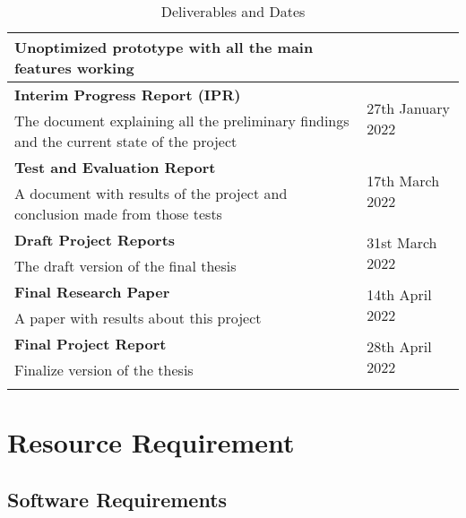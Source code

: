 \begin{longtable}{|p{11cm}|p{3.5cm}|}
Unoptimized prototype with all the main features working &  \\ \hline
\textbf{Interim Progress Report (IPR)} & \multirow{2}{*}{27th January 2022} \\
The document explaining all the preliminary findings and the current state of the project &  \\ \hline
\textbf{Test and Evaluation Report} & \multirow{2}{*}{17th March 2022} \\
A document with results of the project and conclusion made from those tests &  \\ \hline
\textbf{Draft Project Reports} & \multirow{2}{*}{31st March 2022} \\
The draft version of the final thesis &  \\ \hline
\textbf{Final Research Paper} & \multirow{2}{*}{14th April 2022} \\
A paper with results about this project &  \\ \hline
\textbf{Final Project Report} & \multirow{2}{*}{28th April 2022} \\
Finalize version of the thesis &  \\ \hline
\caption{Deliverables and Dates}
\end{longtable}


\section{Resource Requirement}

\subsection{Software Requirements}

